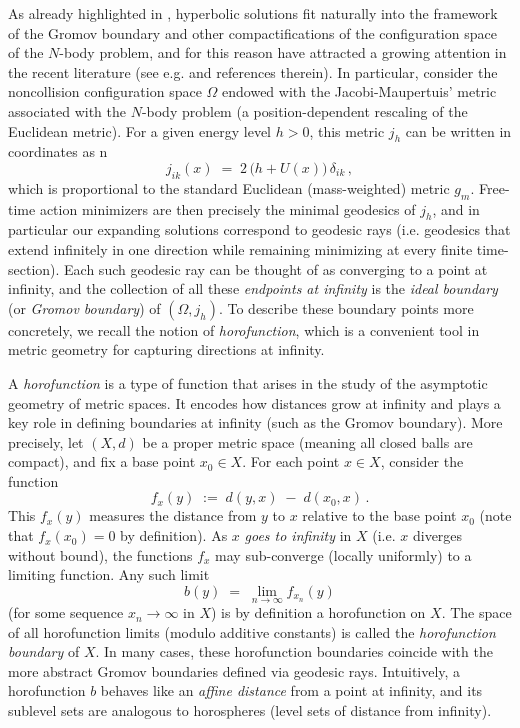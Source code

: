 \documentclass[a4paper,10pt]{amsart}
\theoremstyle{plain}
\theoremstyle{definition}
\numberwithin{equation}{section}
\numberwithin{thm}{section}
\begin{document}
As already highlighted in \cite{MadernaVenturelli_HyperbolicMotions}, hyperbolic solutions fit naturally into the framework of the Gromov boundary and other compactifications of the configuration space of the $N$-body problem, and for this reason have attracted a growing attention in the recent literature (see e.g. \cite{BurgosMaderna_GeodesicRays,MR4121133,zbMATH06723100,MR4331257,MR3868425,arXiv:2408.00877, zbMATH07765044,MR4600219,PolimeniTerracini} and references therein). In particular, consider the noncollision configuration space $\Omega$ endowed with the Jacobi-Maupertuis' metric associated with the $N$-body problem (a position-dependent rescaling of the Euclidean metric). For a given energy level $h>0$, this metric $j_h$ can be written in coordinates as n
\[ j_{ik}(x) \;=\; 2\,\big(h + U(x)\big)\,\delta_{ik}\,, \] 
which is proportional to the standard Euclidean (mass-weighted) metric $g_m$. Free-time action minimizers are then precisely the minimal geodesics of $j_h$, and in particular our expanding solutions correspond to geodesic rays (i.e. geodesics that extend infinitely in one direction while remaining minimizing at every finite time-section). Each such geodesic ray can be thought of as converging to a point at infinity, and the collection of all these \emph{endpoints at infinity} is the \emph{ideal boundary} (or \emph{Gromov boundary}) of $(\Omega, j_h)$. To describe these boundary points more concretely, we recall the notion of \emph{horofunction}, which is a convenient tool in metric geometry for capturing directions at infinity.

A \emph{horofunction} is a type of function that arises in the study of the asymptotic geometry of metric spaces. It encodes how distances grow at infinity and plays a key role in defining boundaries at infinity (such as the Gromov boundary). More precisely, let $(X,d)$ be a proper metric space (meaning all closed balls are compact), and fix a base point $x_0 \in X$. For each point $x \in X$, consider the function 
\[ 
f_x(y) \;:=\; d(y,x)\;-\;d(x_0,x)\,. 
\] 
This $f_x(y)$ measures the distance from $y$ to $x$ relative to the base point $x_0$ (note that $f_x(x_0)=0$ by definition). As $x$ \emph{goes to infinity} in $X$ (i.e. $x$ diverges without bound), the functions $f_x$ may sub-converge (locally uniformly) to a limiting function. Any such limit 
\[ 
b(y) \;=\; \lim_{n\to\infty} f_{x_n}(y) 
\] 
(for some sequence $x_n \to \infty$ in $X$) is by definition a horofunction on $X$. The space of all horofunction limits (modulo additive constants) is called the \emph{horofunction boundary} of $X$. In many cases, these horofunction boundaries coincide with the more abstract Gromov boundaries defined via geodesic rays. Intuitively, a horofunction $b$ behaves like an \emph{affine distance} from a point at infinity, and its sublevel sets are analogous to horospheres (level sets of distance from infinity).
\end{document}
